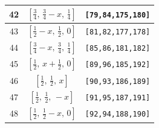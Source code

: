 \documentclass[fleqn,8pt]{jsarticle}
\begin{document}
\begin{longtable}{ccc}
42 & $\left[ \frac{3}{4},\, \frac{3}{4} - x,\, \frac{1}{4} \right]$ & {\tt [79,84,175,180]} \\ \hline
43 & $\left[ \frac{1}{2} - x,\, \frac{1}{2},\, 0 \right]$ & {\tt [81,82,177,178]} \\ \hline
44 & $\left[ \frac{3}{4} - x,\, \frac{3}{4},\, \frac{1}{4} \right]$ & {\tt [85,86,181,182]} \\ \hline
45 & $\left[ \frac{1}{2},\, x + \frac{1}{2},\, 0 \right]$ & {\tt [89,96,185,192]} \\ \hline
46 & $\left[ \frac{1}{2},\, \frac{1}{2},\, x \right]$ & {\tt [90,93,186,189]} \\ \hline
47 & $\left[ \frac{1}{2},\, \frac{1}{2},\, - x \right]$ & {\tt [91,95,187,191]} \\ \hline
48 & $\left[ \frac{1}{2},\, \frac{1}{2} - x,\, 0 \right]$ & {\tt [92,94,188,190]} \\
\end{longtable}
\renewcommand{\arraystretch}{1.2}
\end{document}
